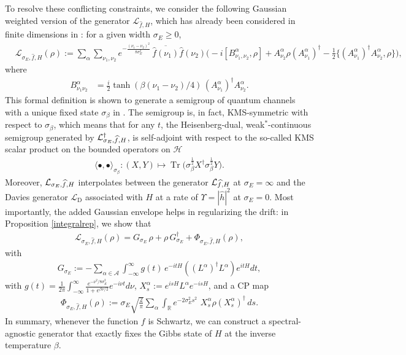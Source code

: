 \documentclass[11pt]{amsart}
\newcommand{\1}{\mathbbm{1}}
\newcommand{\Tr}{\operatorname{Tr}}
\theoremstyle{plain}
\theoremstyle{definition}
\theoremstyle{remark}
\numberwithin{equation}{section}
\begin{document}
\smallskip
To resolve these conflicting constraints, we consider the following Gaussian weighted version of the generator $\mathcal{L}_{\widehat{f},H}$, which has already been considered in finite dimensions in \cite{gilyen2024quantum,slezak2026polynomial}: for a given width $\sigma_E\ge 0$,
\begin{align}
&\mathcal{L}_{\sigma_E,\widehat{f},H}(\rho)\!:=\!\sum_\alpha\sum_{\nu_1,\nu_2}\!e^{-\frac{(\nu_1-\nu_2)^2}{8\sigma_E^2}}\,\overline{\widehat{f}(\nu_1)}\widehat{f}(\nu_2) \Big(\!\!-i[B^\alpha_{\nu_1,\nu_2},\rho] +A^\alpha_{\nu_2}\rho (A^\alpha_{\nu_1})^\dagger\!-\!\frac{1}{2}\{(A^\alpha_{\nu_1})^\dagger A^\alpha_{\nu_2},\rho\}\Big),\nonumber
\end{align}
where 
\begin{align*}
B^\alpha_{\nu_1\nu_2}
&=\frac{i}{2}\tanh(\beta(\nu_1-\nu_2)/4)\,(A^\alpha_{\nu_1})^\dagger A^\alpha_{\nu_2}.
\end{align*}
This formal definition is shown to generate a semigroup of quantum channels with a unique fixed state $\sigma_{\beta}$ in . The semigroup is, in fact, KMS-symmetric with respect to $\sigma_\beta$, which means that for any $t$, the Heisenberg-dual, weak$^*$-continuous semigroup generated by $\mathcal{L}_{\smash{\sigma_E,\widehat{f},H}}^\dagger$, is self-adjoint with respect to the so-called KMS scalar product on the bounded operators on $\mathcal{H}$
\begin{align}\label{eq:KMSsymmetry}
\langle \bullet,\bullet \rangle_{\sigma_\beta}:(X,Y)\mapsto \Tr\Big(\sigma_\beta^{\frac{1}{2}}X^\dagger \sigma_\beta^{\frac{1}{2}}Y\Big).
\end{align}
Moreover, $\mathcal{L}_{\smash{\sigma_E,\widehat{f},H}}$ interpolates between the generator $\mathcal{L}_{\smash{\widehat{f},H}}$ at  $\sigma_E=\infty$ and the Davies generator $\mathcal{L}_{\operatorname{D}}$ associated with $H$ at a rate of $\Upsilon=|\widehat{h}|^2$ at $\sigma_E=0$. Most importantly, the added Gaussian envelope helps in regularizing the drift: in Proposition \ref{integralrep}, we show that
\begin{align}\label{eq:LsigmaEintro}
\mathcal{L}_{\sigma_E,\widehat{f},H}(\rho)=G_{\sigma_E}\,\rho+\rho\, G_{\sigma_E}^\dagger+\Phi_{\sigma_E,\widehat{f},H}(\rho),
\end{align}
with 
\begin{align*}
 G_{\sigma_E}:=-\sum_{\alpha\in\mathcal{A}}\int_{-\infty}^\infty g(t)\,e^{-itH}((L^{\alpha})^\dagger L^\alpha)e^{itH}dt,
\end{align*}
with 
$g(t)=\frac{1}{2\pi}\int_{-\infty}^\infty \frac{e^{-\nu^2/8\sigma_E^2}}{1+e^{\beta\nu/2}} e^{-i\nu t}d\nu$, $X^{\alpha}_s:=e^{isH}L^\alpha e^{-isH}$, and a CP map 
\begin{align*}
\Phi_{\sigma_E,\widehat{f},H}(\rho):=\sigma_E\sqrt{\frac{2}{\pi}}\sum_{\alpha}\int_{\mathbb{R}}e^{-2\sigma_E^2 s^2}\, \, X_s^{\alpha} \rho (X_s^\alpha)^\dagger \,ds.
\end{align*}
In summary, whenever the function $f$ is Schwartz, we can construct a spectral-agnostic generator that exactly fixes the Gibbs state of $H$ at the inverse temperature $\beta$. 
\end{document}
